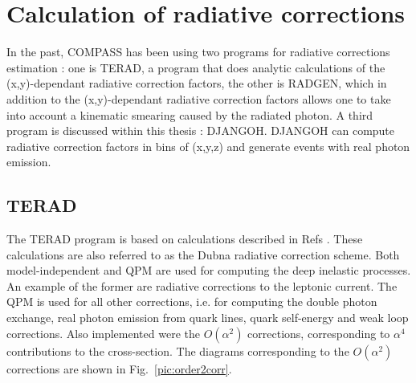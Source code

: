 
\chapter{Calculation of radiative corrections} %

\label{ch:Calculation} %


In the past, COMPASS has been using two programs for radiative corrections estimation : one is TERAD, a program that does analytic calculations of the (x,y)-dependant radiative correction factors, the other is RADGEN, which in addition to the (x,y)-dependant radiative correction factors allows one to take into account a kinematic smearing caused by the radiated photon. A third program is discussed within this thesis : DJANGOH. DJANGOH can compute radiative correction factors in bins of (x,y,z) and generate events with real photon emission.

\section{TERAD}

The TERAD program is based on calculations described in Refs \cite{TERAD1,TERAD2,TERAD3}. These calculations are also referred to as the Dubna radiative correction scheme. Both model-independent and QPM are used for computing the deep inelastic processes. An example of the former are radiative corrections to the leptonic current. The QPM is used for all other corrections, i.e. for computing the double photon exchange, real photon emission from quark lines, quark self-energy and weak loop corrections. Also implemented were the $O(\alpha^2)$ corrections, corresponding to $\alpha^4$ contributions to the cross-section. The diagrams corresponding to the $O(\alpha^2)$ corrections are shown in Fig.~\ref{pic:order2corr}.

